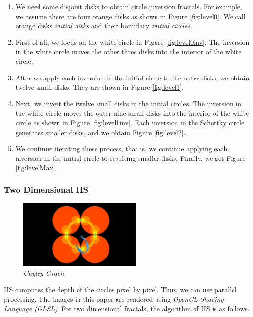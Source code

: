 \begin{enumerate}
 \item We need some disjoint disks to obtain circle inversion fractals.
       For example, we assume there are four orange disks as shown in
       Figure \ref{fig:level0}. We call orange disks \textit{initial
       disks} and their boundary \textit{initial circles}.
 \item First of all, we focus on the white circle in Figure
       \ref{fig:level0inv}. The inversion in the white circle moves the
       other three disks into the interior of the white circle.
 \item After we apply each inversion in the initial circle to the outer disks,
       we obtain twelve small disks. They are shown in Figure \ref{fig:level1}.
 \item Next, we invert the twelve small disks in the initial circles.
       The inversion in the white circle moves the outer nine small disks
       into the interior of the white circle as shown in Figure \ref{fig:level1inv}.
       Each inversion in the Schottky circle generates smaller disks, and we
       obtain Figure \ref{fig:level2}.
 \item We continue iterating these process, that is, we continue
       applying each inversion in the initial circle to resulting
       smaller disks.
       Finally, we get Figure \ref{fig:levelMax}.
\end{enumerate}

\subsubsection{Two Dimensional IIS}

\begin{figure}[htbp]
  \center
  \includegraphics[height=1.35in, keepaspectratio]{img/preparation/orbIIS.png}
  \caption{\textit{Cayley Graph}}
  \label{fig:cayleyGraph}
 \hspace*{\fill}
\end{figure}

IIS computes the depth of the circles pixel by pixel.
Thus, we can use parallel processing.
The images in this paper are rendered using \textit{OpenGL Shading
Language (GLSL)}.
For two dimensional fractals, the algorithm of IIS is as follows.

